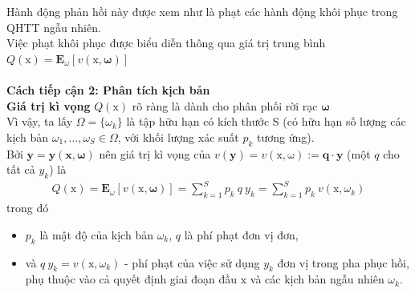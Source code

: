 \documentclass[a4paper]{article}
\begin{document}
    Hành động phản hồi này được xem như là phạt các hành động khôi phục trong QHTT ngẫu nhiên.\\
	Việc phạt khôi phục được biểu diễn thông qua giá trị trung bình $Q(\boldsymbol{\mathrm{x}})
    =\mathbf{E}_{\omega}[v(\boldsymbol{\mathrm{x}},\boldsymbol{\omega})]$\\
    \\
    \textbf{Cách tiếp cận 2: Phân tích kịch bản}\\
    \textbf{Giá trị kì vọng} $Q(\mathrm{x})$ rõ ràng là dành cho phân phối rời rạc $\boldsymbol{\omega}$\\
    Vì vậy, ta lấy $\Omega = \{ \omega_k \}$ là tập hữu hạn có kích thước S (có hữu hạn số lượng các kịch bản
        $\omega_1, \dots , \omega_S \in \Omega$, với khối lượng xác suất $p_k$ tương ứng).\\
    Bởi $\boldsymbol{y=y(x, \omega)}$ nên giá trị kì vọng của $v(\boldsymbol{y})=v(\boldsymbol{\mathrm{x, \omega}}) \mathrel{:=} \boldsymbol{q \cdot y}$
        (một $q$ cho tất cả $y_k$) là
    \begin{gather}
        Q(\boldsymbol{\mathrm{x}}) = \mathbf{E}_{\omega}[v(\boldsymbol{\mathrm{x}},\boldsymbol{\omega})] =
        \sum_{k=1}^{S} p_k \: q \: y_k = \sum_{k=1}^{S} p_k \: v(\boldsymbol{\mathrm{x}},\omega_k)
    \end{gather}
    trong đó\\
    \begin{itemize}
        \item $p_k$ là mật độ của kịch bản $\omega_k$, $q$ là phí phạt đơn vị đơn,\\
        \item và $q \: y_k = v(\boldsymbol{\mathrm{x}},\omega_k)$ - phí phạt của việc 
            sử dụng $y_k$ đơn vị trong pha phục hồi,\\
            phụ thuộc vào cả quyết định giai đoạn đầu $\boldsymbol{\mathrm{x}}$ và các kịch bản ngẫu nhiên $\omega_k$.
    \end{itemize}
\end{document}
